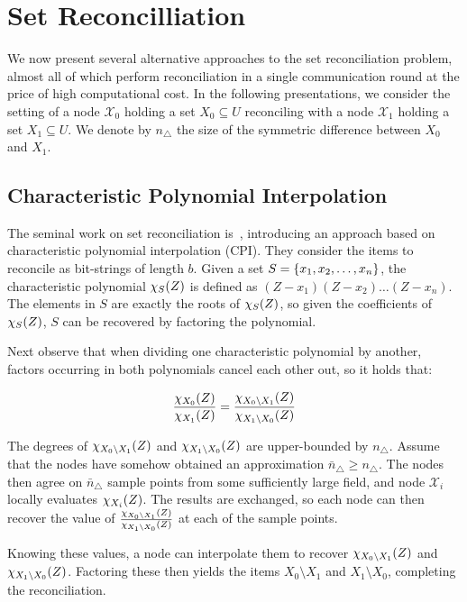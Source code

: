 \section{Set Reconcilliation}
\label{related-reconciliation}

We now present several alternative approaches to the set reconciliation problem, almost all of which perform reconciliation in a single communication round at the price of high computational cost. In the following presentations, we consider the setting of a node $\mathcal{X}_0$ holding a set $X_0 \subseteq U$ reconciling with a node $\mathcal{X}_1$ holding a set $X_1 \subseteq U$. We denote by $n_{\triangle}$ the size of the symmetric difference between $X_0$ and $X_1$.

\subsection{Characteristic Polynomial Interpolation}

The seminal work on set reconciliation is~\cite{minsky2003set}, introducing an approach based on characteristic polynomial interpolation (CPI). They consider the items to reconcile as bit-strings of length $b$. Given a set $S = \{x_1, x_2, \ldots, x_n\}$, the characteristic polynomial $\chi_{S}(Z)$ is defined as $(Z - x_1)(Z - x_2)\ldots(Z - x_n)$. The elements in $S$ are exactly the roots of $\chi_{S}(Z)$, so given the coefficients of $\chi_{S}(Z)$, $S$ can be recovered by factoring the polynomial.

Next observe that when dividing one characteristic polynomial by another, factors occurring in both polynomials cancel each other out, so it holds that:

\[
\frac{\chi_{X_0}(Z)}{\chi_{X_1}(Z)} = \frac{\chi_{X_0 \setminus X_1}(Z)}{\chi_{X_1 \setminus X_0}(Z)}
\]

The degrees of $\chi_{X_0 \setminus X_1}(Z)$ and $\chi_{X_1 \setminus X_0}(Z)$ are upper-bounded by $n_{\triangle}$. Assume that the nodes have somehow obtained an approximation $\bar{n}_{\triangle} \geq n_{\triangle}$. The nodes then agree on $\bar{n}_{\triangle}$ sample points from some sufficiently large field, and node $\mathcal{X}_i$ locally evaluates $\chi_{X_i}(Z)$. The results are exchanged, so each node can then recover the value of $\frac{\chi_{X_0 \setminus X_1}(Z)}{\chi_{X_1 \setminus X_0}(Z)}$ at each of the sample points.

Knowing these values, a node can interpolate them to recover $\chi_{X_0 \setminus X_1}(Z)$ and $\chi_{X_1 \setminus X_0}(Z)$. Factoring these then yields the items $X_0 \setminus X_1$ and $X_1 \setminus X_0$, completing the reconciliation.

